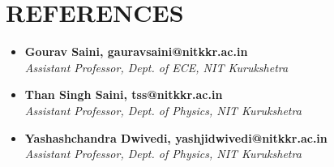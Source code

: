 \documentclass[12pt]{my_cv}
\begin{document}
\section{REFERENCES}
\begin{itemize}
\item \textbf{Gourav Saini, gauravsaini@nitkkr.ac.in}
\\ \textit{Assistant Professor, Dept. of ECE, NIT Kurukshetra}
\item \textbf{Than Singh Saini, tss@nitkkr.ac.in}
\\ \textit{Assistant Professor, Dept. of Physics, NIT Kurukshetra}
\item \textbf{Yashashchandra Dwivedi, yashjidwivedi@nitkkr.ac.in}
\\ \textit{Assistant Professor, Dept. of Physics, NIT Kurukshetra}
\end{itemize}
\end{document}
